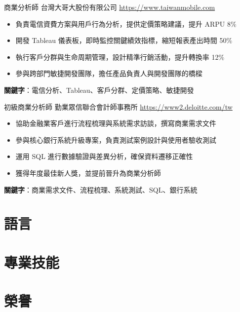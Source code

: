 \documentclass[a4paper, serif, 10pt]{moderncv}
\begin{document}
        {商業分析師}
        {台灣大哥大股份有限公司}
        {\url{https://www.taiwanmobile.com}}
        {}
        {\begin{itemize}
\item 負責電信資費方案與用戶行為分析，提供定價策略建議，提升 ARPU 8\%
\item 開發 Tableau 儀表板，即時監控關鍵績效指標，縮短報表產出時間 50\%
\item 執行客戶分群與生命周期管理，設計精準行銷活動，提升轉換率 12\%
\item 參與跨部門敏捷開發團隊，擔任產品負責人與開發團隊的橋樑
\end{itemize}
\textbf{關鍵字}：電信分析、Tableau、客戶分群、定價策略、敏捷開發}

        {初級商業分析師}
        {勤業眾信聯合會計師事務所}
        {\url{https://www2.deloitte.com/tw}}
        {}
        {\begin{itemize}
\item 協助金融業客戶進行流程梳理與系統需求訪談，撰寫商業需求文件
\item 參與核心銀行系統升級專案，負責測試案例設計與使用者驗收測試
\item 運用 SQL 進行數據驗證與差異分析，確保資料遷移正確性
\item 獲得年度最佳新人獎，並提前晉升為商業分析師
\end{itemize}
\textbf{關鍵字}：商業需求文件、流程梳理、系統測試、SQL、銀行系統}
\section{語言}

\section{專業技能}

\section{榮譽}
\end{document}

